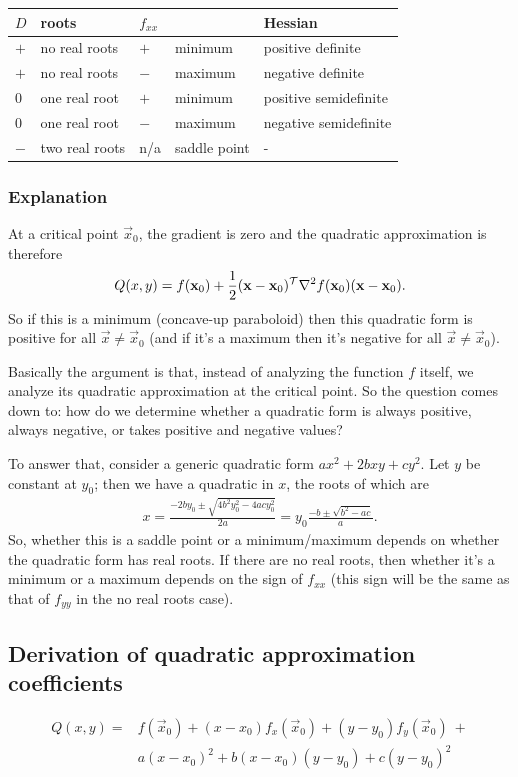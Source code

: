 \begin{tabular}{ l l l l l }
  $D$    & roots          & $f_{xx}$ &  & Hessian \\
  \hline
  $+$    & no real roots  & $+$     & minimum        & positive definite \\
  $+$    & no real roots  & $-$     & maximum        & negative definite \\
  $0$    & one real root  & $+$     & minimum        & positive semidefinite \\
  $0$    & one real root  & $-$     & maximum        & negative semidefinite \\
  $-$    & two real roots & n/a     & saddle point   & - \\
\end{tabular}

\subsubsection*{Explanation}
At a critical point $\vec x_0$, the gradient is zero and the quadratic approximation is therefore
$$
Q(x, y) = f(\mathbf x_0) + \frac{1}{2}(\mathbf x - \mathbf x_0)^\mathcal T \nabla^2 f(\mathbf x_0)(\mathbf x - \mathbf x_0).
$$
So if this is a minimum (concave-up paraboloid) then this quadratic form is
positive for all $\vec x \neq \vec x_0$ (and if it's a maximum then it's
negative for all $\vec x \neq \vec x_0$).

Basically the argument is that, instead of analyzing the function $f$ itself,
we analyze its quadratic approximation at the critical point. So the question
comes down to: how do we determine whether a quadratic form is always positive,
always negative, or takes positive and negative values?

To answer that, consider a generic quadratic form $ax^2 + 2bxy + cy^2$. Let $y$
be constant at $y_0$; then we have a quadratic in $x$, the roots of which are
\begin{align*}
  x
  = \frac{-2by_0 \pm \sqrt{4b^2y_0^2 - 4acy_0^2}}{2a}
  = y_0\frac{-b \pm \sqrt{b^2 - ac}}{a}.
\end{align*}
So, whether this is a saddle point or a minimum/maximum depends on whether the
quadratic form has real roots. If there are no real roots, then whether it's a
minimum or a maximum depends on the sign of $f_{xx}$ (this sign will be the
same as that of $f_{yy}$ in the no real roots case).

\subsection{Derivation of quadratic approximation coefficients}
\begin{align*}
Q(x, y) =
&f(\vec x_0) + (x - x_0)f_x(\vec x_0) +
(y - y_0)f_y(\vec x_0) ~+ \\
&a(x - x_0)^2 +
b(x - x_0)(y - y_0) +
c(y - y_0)^2
\end{align*}

